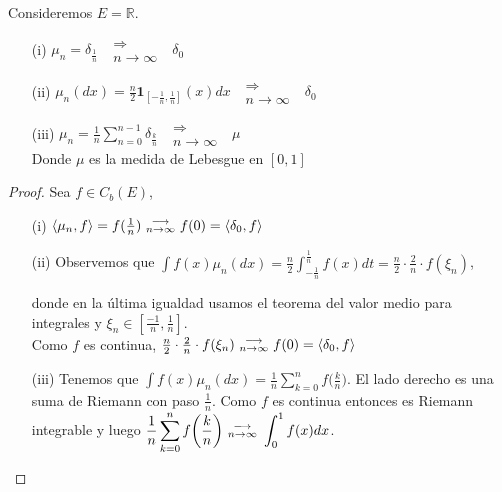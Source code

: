 \begin{example}[\label{ejemplo:1_2_1}] 
Consideremos $E=\mathbb{R}$.
\begin{itemize} %
    \item[(i)] $\mu_n=\delta_{\frac{1}{n}} \mbox{ }\substack{\Longrightarrow \\n \to \infty}\mbox{ } \delta_0$ 
    \item[(ii)] $\displaystyle\mu_n(dx) = \frac{n}{2}\mathbf{1}_{[-\frac{1}{n},\frac{1}{n}]}(x)dx \mbox{ }\substack{\Longrightarrow \\n \to \infty}\mbox{ } \delta_0$
    \item[(iii)] $\displaystyle\mu_n=\frac{1}{n}\sum_{n=0}^{n-1}\delta_{\frac{k}{n}} \mbox{ }\substack{\Longrightarrow \\n \to \infty}\mbox{ } \mu$ %
    \\ Donde $\mu$ es la medida de Lebesgue en $[0,1]$
\end{itemize}
\end{example}
\begin{proof}
\gris Sea $f\in C_b(E)$, %
\begin{itemize}
    \item[(i)] $\langle \mu_n,f\rangle=f(\frac{1}{n})\mbox{ }\substack{\longrightarrow \\ n\to\infty}\mbox{ } f(0)=\langle \delta_0,f\rangle$
    \item[(ii)] Observemos que 
    $\displaystyle\int f(x)\mu_n(dx)=\frac{n}{2}\int^{\frac{1}{n}}_{-\frac{1}{n}}f(x)dt = \frac{n}{2}\cdot\frac{2}{n}\cdot f(\xi_n)$,
    
    donde en la última igualdad usamos el teorema del valor medio para integrales y $\xi_n\in[\frac{-1}{n},\frac{1}{n}]$.
    \\ Como $f$ es continua, $\frac{n}{2}\cdot\frac{2}{n}\cdot f(\xi_n) \mbox{ }\substack{\longrightarrow \\ n\to\infty}\mbox{ } f(0)=\langle \delta_0,f \rangle$
    \item[(iii)] Tenemos que $\displaystyle\int f(x)\mu_n(dx) = \frac{1}{n}\sum^n_{k=0}f\bigg(\frac{k}{n}\bigg)$. El lado derecho es una suma de Riemann con paso $\frac{1}{n}$. Como $f$ es continua entonces es Riemann integrable y luego $\displaystyle \frac{1}{n}\sum^n_{k=0}f\bigg(\frac{k}{n}\bigg) \mbox{ }\substack{\longrightarrow \\ n\to\infty}\mbox{ } \int_0^1 f(x)dx$.
\end{itemize} 
\findem
\negro \end{proof}

